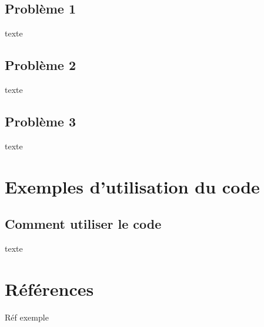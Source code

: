 \documentclass{article}      %
\begin{document}
\subsection{Problème 1}
texte
\subsection{Problème 2}
texte
\subsection{Problème 3}
texte



\section{Exemples d'utilisation du code}
\subsection{Comment utiliser le code}
texte


\section{Références}
\begin{thebibliography}{9}
Réf exemple

\end{thebibliography}
\end{document}
